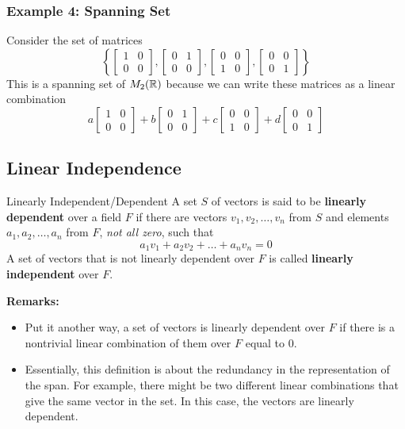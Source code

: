 \documentclass[letterpaper]{article}
\begin{document}
\subsubsection{Example 4: Spanning Set}
Consider the set of matrices 
\[\left\{\begin{bmatrix}
    1 & 0 \\ 0 & 0 
\end{bmatrix}, \begin{bmatrix}
    0 & 1 \\ 0 & 0 
\end{bmatrix}, \begin{bmatrix}
    0 & 0 \\ 1 & 0
\end{bmatrix}, \begin{bmatrix}
    0 & 0 \\ 0 & 1
\end{bmatrix}\right\}\]
This is a spanning set of $M_{2}(\mathbb{R})$ because we can write these matrices as a linear combination
\[a\begin{bmatrix}
    1 & 0 \\ 0 & 0 
\end{bmatrix} + b\begin{bmatrix}
    0 & 1 \\ 0 & 0 
\end{bmatrix} + c\begin{bmatrix}
    0 & 0 \\ 1 & 0
\end{bmatrix} + d\begin{bmatrix}
    0 & 0 \\ 0 & 1
\end{bmatrix}\]


\subsection{Linear Independence}
\begin{definition}{Linearly Independent/Dependent}{}
    A set $S$ of vectors is said to be \textbf{linearly dependent} over a field $F$ if there are vectors $v_1, v_2, \dots, v_n$ from $S$ and elements $a_1, a_2, \dots, a_n$ from $F$, \emph{not all zero}, such that 
    \[a_1 v_1 + a_2 v_2 + \dots + a_n v_n = 0\]
    A set of vectors that is not linearly dependent over $F$ is called \textbf{linearly independent} over $F$.
\end{definition}
\textbf{Remarks:}
\begin{itemize}
    \item Put it another way, a set of vectors is linearly dependent over $F$ if there is a nontrivial linear combination of them over $F$ equal to 0. 
    \item Essentially, this definition is about the redundancy in the representation of the span. For example, there might be two different linear combinations that give the same vector in the set. In this case, the vectors are linearly dependent. 
\end{itemize} 
\end{document}
